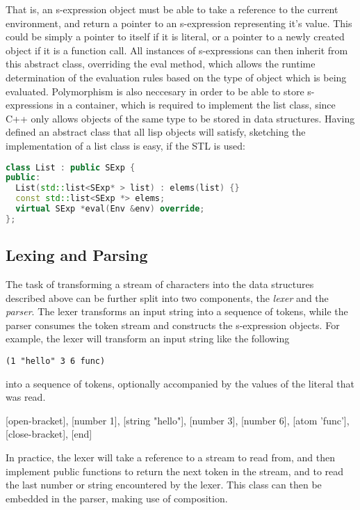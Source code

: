\documentclass[12pt]{article}
\begin{document}
That is, an s-expression object must be able to take a reference to the current environment, and return a pointer to an s-expression representing it's value. This could be 
simply a pointer to itself if it is literal, or a pointer to a newly created object if it is a function call. All instances of s-expressions can then inherit from this abstract class, 
overriding the eval method, which allows the runtime determination of the evaluation rules based on the type of object which is being evaluated. Polymorphism is also 
neccesary in order to be able to store s-expressions in a container, which is required to implement the list class, since C++ only allows objects of the same type to be stored in data structures. Having defined an abstract class that all lisp objects will satisfy, sketching the implementation of a list class is easy, if the STL is used:
\begin{lstlisting}[language=C++]
class List : public SExp {
public:
  List(std::list<SExp* > list) : elems(list) {}
  const std::list<SExp *> elems;
  virtual SExp *eval(Env &env) override;
};
\end{lstlisting}


\subsection{Lexing and Parsing}
\label{section:parser}

The task of transforming a stream of characters into the data structures described above can be further split into two components, the \textit{lexer} and the \textit{parser}.
The lexer transforms an input string into a sequence of tokens, while the parser consumes the token stream and constructs the s-expression objects. For example, the 
lexer will transform an input string like the following
\begin{lstlisting}
(1 "hello" 3 6 func) 
\end{lstlisting}
into a sequence of tokens, optionally accompanied by the values of the literal that was read. 

[open-bracket], [number 1], [string "hello"], [number 3], [number 6], [atom 'func'], [close-bracket], [end]

In practice, the lexer will take a reference to a stream to read from, and then implement public functions to return the next token in the stream, and to read the last number
or string encountered by the lexer. This class can then be embedded in the parser, making use of composition.
\end{document}
